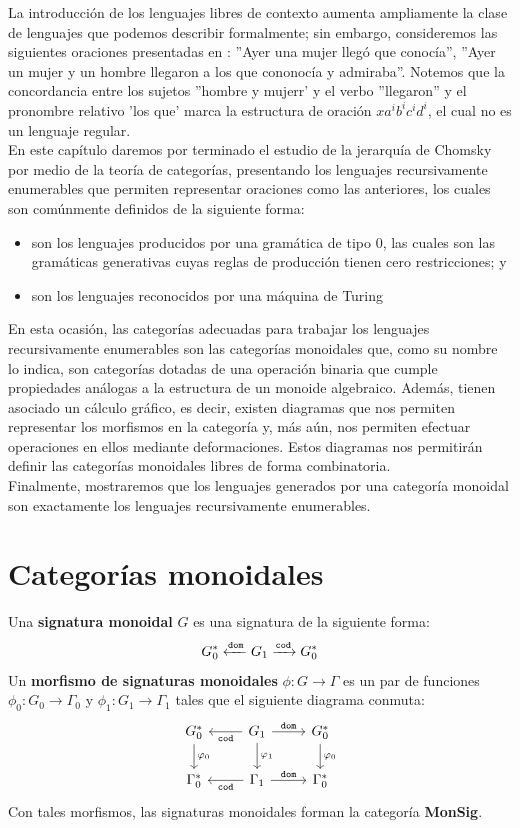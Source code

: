 \documentclass[../main.tex]{subfiles}
\begin{document}
La introducción de los lenguajes libres de contexto aumenta ampliamente la clase de lenguajes que podemos describir formalmente; sin embargo, consideremos las siguientes oraciones presentadas en \cite{levy2012}: ''Ayer una mujer llegó que conocía'', ''Ayer un mujer y un hombre llegaron a los que cononocía y admiraba''. Notemos que la concordancia entre los sujetos ''hombre y mujerr' y el verbo ''llegaron'' y el pronombre relativo 'los que' marca la estructura de oración $xa^ib^ic^id^i$, el cual no es un lenguaje regular. \\
En este capítulo daremos por terminado el estudio de la jerarquía de Chomsky por medio de la teoría de categorías, presentando los lenguajes recursivamente enumerables que permiten representar oraciones como las anteriores, los cuales son comúnmente definidos de la siguiente forma:
\begin{itemize}
    \item son los lenguajes producidos por una gramática de tipo 0, las cuales son las gramáticas generativas cuyas reglas de producción tienen cero restricciones; y
    \item son los lenguajes reconocidos por una máquina de Turing 
\end{itemize}
En esta ocasión, las categorías adecuadas para trabajar los lenguajes recursivamente enumerables son las categorías monoidales que, como su nombre lo indica, son categorías dotadas de una operación binaria que cumple propiedades análogas a la estructura de un monoide algebraico. Además, tienen asociado un cálculo gráfico, es decir, existen diagramas que nos permiten representar los morfismos en la categoría y, más aún, nos permiten efectuar operaciones en ellos mediante deformaciones. Estos diagramas nos permitirán definir las categorías monoidales libres de forma combinatoria. \\
Finalmente, mostraremos que los lenguajes generados por una categoría monoidal son exactamente los lenguajes recursivamente enumerables. 

\section{Categorías monoidales}

\begin{dfn}
	Una \textbf{signatura monoidal} $G$ es una signatura de la siguiente forma: 
	$$G_0^* \xleftarrow{\tt{dom}} G_1 \xrightarrow{\tt{cod}} G_0^*$$
    Un \textbf{morfismo de signaturas monoidales} \( \phi:G \to \Gamma\) es un par de funciones \( \phi_0: G_0 \to \Gamma_0\) y \( \phi_1: G_1 \to \Gamma_1\) tales que el siguiente diagrama conmuta: 
	\[
	\begin{tikzcd}
		G_0^* \arrow{d}{\phi_0} & G_1 \arrow{r}{\tt{dom}} \arrow{l}{\tt{cod}} \arrow{d}{\phi_1} & G_0^* \arrow{d}{\phi_0} \\
		\Gamma_0^* & \Gamma_1 \arrow{r}{\tt{dom}} \arrow{l}{\tt{cod}} & \Gamma_0^*
	\end{tikzcd}
	\]
	Con tales morfismos, las signaturas monoidales forman la categoría \textbf{MonSig}.	
\end{dfn}
\end{document}
